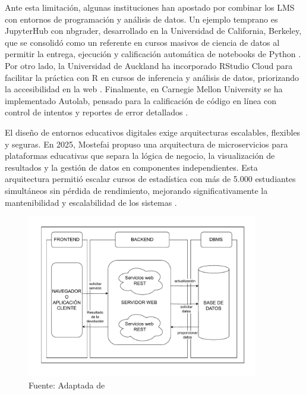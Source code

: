 \documentclass[letter,oneside,12pt,spanish]{report}
\begin{document}
\newpage

Ante esta limitación, algunas instituciones han apostado por combinar los LMS con entornos de programación y análisis de datos. Un ejemplo temprano es JupyterHub con nbgrader, desarrollado en la Universidad de California, Berkeley, que se consolidó como un referente en cursos masivos de ciencia de datos al permitir la entrega, ejecución y calificación automática de notebooks de Python \parencite{berkeley2018}. Por otro lado, la Universidad de Auckland ha incorporado RStudio Cloud para facilitar la práctica con R en cursos de inferencia y análisis de datos, priorizando la accesibilidad en la web \parencite{rubio2023}. Finalmente, en Carnegie Mellon University se ha implementado Autolab, pensado para la calificación de código en línea con control de intentos y reportes de error detallados \parencite{rubio2023}.

El diseño de entornos educativos digitales exige arquitecturas escalables, flexibles y seguras. En 2025, Mostefai propuso una arquitectura de microservicios para plataformas educativas que separa la lógica de negocio, la visualización de resultados y la gestión de datos en componentes independientes. Esta arquitectura permitió escalar cursos de estadística con más de 5.000 estudiantes simultáneos sin pérdida de rendimiento, mejorando significativamente la mantenibilidad y escalabilidad de los sistemas \parencite{Mostefai2025}.

\begin{figure}[ht]
    \centering
    \includegraphics[width=0.9\textwidth]{Figs/Microservicios.pdf}
    \label{fig:Microservicios}
    \\Fuente: Adaptada de \textcite{Mostefai2025}
\end{figure}
\end{document}
